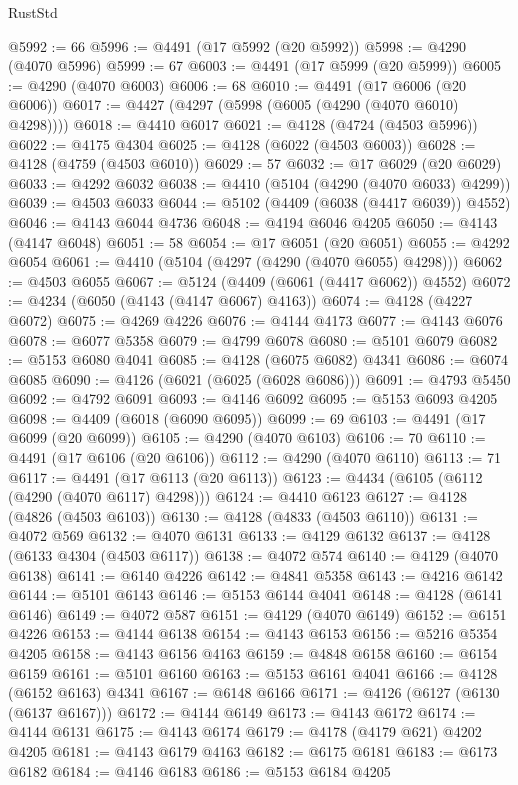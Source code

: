 \begin{lexlean}{RustStd}
\begin{coremodule}
@5992 := 66
@5996 := @4491 (@17 @5992 (@20 @5992))
@5998 := @4290 (@4070 @5996)
@5999 := 67
@6003 := @4491 (@17 @5999 (@20 @5999))
@6005 := @4290 (@4070 @6003)
@6006 := 68
@6010 := @4491 (@17 @6006 (@20 @6006))
@6017 := @4427 (@4297 (@5998 (@6005 (@4290 (@4070 @6010) @4298))))
@6018 := @4410 @6017
@6021 := @4128 (@4724 (@4503 @5996))
@6022 := @4175 @4304
@6025 := @4128 (@6022 (@4503 @6003))
@6028 := @4128 (@4759 (@4503 @6010))
@6029 := 57
@6032 := @17 @6029 (@20 @6029)
@6033 := @4292 @6032
@6038 := @4410 (@5104 (@4290 (@4070 @6033) @4299))
@6039 := @4503 @6033
@6044 := @5102 (@4409 (@6038 (@4417 @6039)) @4552)
@6046 := @4143 @6044 @4736
@6048 := @4194 @6046 @4205
@6050 := @4143 (@4147 @6048)
@6051 := 58
@6054 := @17 @6051 (@20 @6051)
@6055 := @4292 @6054
@6061 := @4410 (@5104 (@4297 (@4290 (@4070 @6055) @4298)))
@6062 := @4503 @6055
@6067 := @5124 (@4409 (@6061 (@4417 @6062)) @4552)
@6072 := @4234 (@6050 (@4143 (@4147 @6067) @4163))
@6074 := @4128 (@4227 @6072)
@6075 := @4269 @4226
@6076 := @4144 @4173
@6077 := @4143 @6076
@6078 := @6077 @5358
@6079 := @4799 @6078
@6080 := @5101 @6079
@6082 := @5153 @6080 @4041
@6085 := @4128 (@6075 @6082) @4341
@6086 := @6074 @6085
@6090 := @4126 (@6021 (@6025 (@6028 @6086)))
@6091 := @4793 @5450
@6092 := @4792 @6091
@6093 := @4146 @6092
@6095 := @5153 @6093 @4205
@6098 := @4409 (@6018 (@6090 @6095))
@6099 := 69
@6103 := @4491 (@17 @6099 (@20 @6099))
@6105 := @4290 (@4070 @6103)
@6106 := 70
@6110 := @4491 (@17 @6106 (@20 @6106))
@6112 := @4290 (@4070 @6110)
@6113 := 71
@6117 := @4491 (@17 @6113 (@20 @6113))
@6123 := @4434 (@6105 (@6112 (@4290 (@4070 @6117) @4298)))
@6124 := @4410 @6123
@6127 := @4128 (@4826 (@4503 @6103))
@6130 := @4128 (@4833 (@4503 @6110))
@6131 := @4072 @569
@6132 := @4070 @6131
@6133 := @4129 @6132
@6137 := @4128 (@6133 @4304 (@4503 @6117))
@6138 := @4072 @574
@6140 := @4129 (@4070 @6138)
@6141 := @6140 @4226
@6142 := @4841 @5358
@6143 := @4216 @6142
@6144 := @5101 @6143
@6146 := @5153 @6144 @4041
@6148 := @4128 (@6141 @6146)
@6149 := @4072 @587
@6151 := @4129 (@4070 @6149)
@6152 := @6151 @4226
@6153 := @4144 @6138
@6154 := @4143 @6153
@6156 := @5216 @5354 @4205
@6158 := @4143 @6156 @4163
@6159 := @4848 @6158
@6160 := @6154 @6159
@6161 := @5101 @6160
@6163 := @5153 @6161 @4041
@6166 := @4128 (@6152 @6163) @4341
@6167 := @6148 @6166
@6171 := @4126 (@6127 (@6130 (@6137 @6167)))
@6172 := @4144 @6149
@6173 := @4143 @6172
@6174 := @4144 @6131
@6175 := @4143 @6174
@6179 := @4178 (@4179 @621) @4202 @4205
@6181 := @4143 @6179 @4163
@6182 := @6175 @6181
@6183 := @6173 @6182
@6184 := @4146 @6183
@6186 := @5153 @6184 @4205

\end{coremodule}
\end{lexlean}
